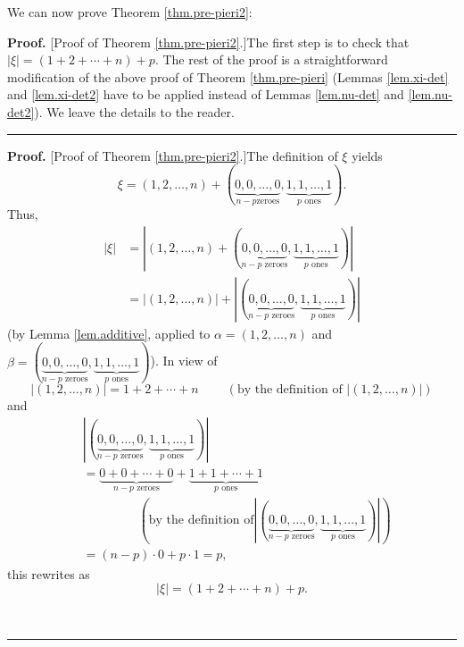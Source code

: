 \documentclass[numbers=enddot,12pt,final,onecolumn,notitlepage,english]{scrartcl}%
\theoremstyle{definition}
\newenvironment{proof}[1][Proof]{\noindent\textbf{#1.} }{\ \rule{0.5em}{0.5em}}
\newenvironment{verlong}{}{}
\newenvironment{vershort}{}{}
\begin{document}
We can now prove Theorem \ref{thm.pre-pieri2}:

\begin{vershort}
\begin{proof}
[Proof of Theorem \ref{thm.pre-pieri2}.]The first step is to check that
$\left\vert \xi\right\vert =\left(  1+2+\cdots+n\right)  +p$. The rest of the
proof is a straightforward modification of the above proof of Theorem
\ref{thm.pre-pieri} (Lemmas \ref{lem.xi-det} and \ref{lem.xi-det2} have to be
applied instead of Lemmas \ref{lem.nu-det} and \ref{lem.nu-det2}). We leave
the details to the reader.
\end{proof}
\end{vershort}

\begin{verlong}
\begin{proof}
[Proof of Theorem \ref{thm.pre-pieri2}.]The definition of $\xi$ yields%
\begin{equation}
\xi=\left(  1,2,\ldots,n\right)  +\left(  \underbrace{0,0,\ldots,0}_{n-p\text{
zeroes}},\underbrace{1,1,\ldots,1}_{p\text{ ones}}\right)  .
\label{pf.thm.pre-pieri2.1}%
\end{equation}
Thus,%
\begin{align*}
\left\vert \xi\right\vert  &  =\left\vert \left(  1,2,\ldots,n\right)
+\left(  \underbrace{0,0,\ldots,0}_{n-p\text{ zeroes}},\underbrace{1,1,\ldots
,1}_{p\text{ ones}}\right)  \right\vert \\
&  =\left\vert \left(  1,2,\ldots,n\right)  \right\vert +\left\vert \left(
\underbrace{0,0,\ldots,0}_{n-p\text{ zeroes}},\underbrace{1,1,\ldots
,1}_{p\text{ ones}}\right)  \right\vert
\end{align*}
(by Lemma \ref{lem.additive}, applied to $\alpha=\left(  1,2,\ldots,n\right)
$ and $\beta=\left(  \underbrace{0,0,\ldots,0}_{n-p\text{ zeroes}%
},\underbrace{1,1,\ldots,1}_{p\text{ ones}}\right)  $). In view of%
\[
\left\vert \left(  1,2,\ldots,n\right)  \right\vert =1+2+\cdots
+n\ \ \ \ \ \ \ \ \ \ \left(  \text{by the definition of }\left\vert \left(
1,2,\ldots,n\right)  \right\vert \right)
\]
and%
\begin{align*}
&  \left\vert \left(  \underbrace{0,0,\ldots,0}_{n-p\text{ zeroes}%
},\underbrace{1,1,\ldots,1}_{p\text{ ones}}\right)  \right\vert \\
&  =\underbrace{0+0+\cdots+0}_{n-p\text{ zeroes}}+\underbrace{1+1+\cdots
+1}_{p\text{ ones}}\\
&  \ \ \ \ \ \ \ \ \ \ \ \ \ \ \ \ \ \ \ \ \left(  \text{by the definition of
}\left\vert \left(  \underbrace{0,0,\ldots,0}_{n-p\text{ zeroes}%
},\underbrace{1,1,\ldots,1}_{p\text{ ones}}\right)  \right\vert \right) \\
&  =\left(  n-p\right)  \cdot0+p\cdot1=p,
\end{align*}
this rewrites as%
\begin{equation}
\left\vert \xi\right\vert =\left(  1+2+\cdots+n\right)  +p.
\label{pf.thm.pre-pieri2.sum-xi}%
\end{equation}



\end{proof}
\end{verlong}
\end{document}

